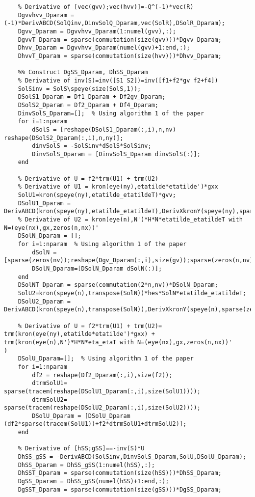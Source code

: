 \documentclass{article}
\begin{document}
\begin{verbatim}
    % Derivative of [vec(gvv);vec(hvv)]=-Q^(-1)*vec(R)
    Dgvvhvv_Dparam = (-1)*DerivABCD(SolQinv,DinvSolQ_Dparam,vec(SolR),DSolR_Dparam);
    Dgvv_Dparam = Dgvvhvv_Dparam(1:numel(gvv),:);
    DgvvT_Dparam = sparse(commutation(size(gvv)))*Dgvv_Dparam;
    Dhvv_Dparam = Dgvvhvv_Dparam(numel(gvv)+1:end,:);
    DhvvT_Dparam = sparse(commutation(size(hvv)))*Dhvv_Dparam;

    %% Construct DgSS_Dparam, DhSS_Dparam
    % Derivative of inv(S)=inv([S1 S2])=inv([f1+f2*gv f2+f4])
    SolSinv = SolS\speye(size(SolS,1));
    DSolS1_Dparam = Df1_Dparam + Df2gv_Dparam;
    DSolS2_Dparam = Df2_Dparam + Df4_Dparam;
    DinvSolS_Dparam=[];  % Using algorithm 1 of the paper
    for i=1:nparam
        dSolS = [reshape(DSolS1_Dparam(:,i),n,nv) reshape(DSolS2_Dparam(:,i),n,ny)];
        dinvSolS = -SolSinv*dSolS*SolSinv;
        DinvSolS_Dparam = [DinvSolS_Dparam dinvSolS(:)];
    end

    % Derivative of U = f2*trm(U1) + trm(U2)
    % Derivative of U1 = kron(eye(ny),etatilde*etatilde')*gxx
    SolU1=kron(speye(ny),etatilde_etatildeT)*gvv;
    DSolU1_Dparam = DerivABCD(kron(speye(ny),etatilde_etatildeT),DerivXkronY(speye(ny),sparse(zeros(ny^2,nparam)),etatilde_etatildeT,Detatilde_etatildeT_Dparam),gvv,Dgvv_Dparam);
    % Derivative of U2 = kron(eye(n),N')*H*N*etatilde_etatildeT with N=(eye(nx),gx,zeros(n,nx))'
    DSolN_Dparam = [];
    for i=1:nparam  % Using algorithm 1 of the paper
        dSolN = [sparse(zeros(nv));reshape(Dgv_Dparam(:,i),size(gv));sparse(zeros(n,nv))];
        DSolN_Dparam=[DSolN_Dparam dSolN(:)];
    end
    DSolNT_Dparam = sparse(commutation(2*n,nv))*DSolN_Dparam;
    SolU2=kron(speye(n),transpose(SolN))*hes*SolN*etatilde_etatildeT;
    DSolU2_Dparam = DerivABCD(kron(speye(n),transpose(SolN)),DerivXkronY(speye(n),sparse(zeros(n^2,nparam)),transpose(SolN),DSolNT_Dparam),hes,Dhes_Dparam,SolN,DSolN_Dparam,etatilde_etatildeT,Detatilde_etatildeT_Dparam);

    % Derivative of U = f2*trm(U1) + trm(U2)= trm(kron(eye(ny),etatilde*etatilde')*gxx) + trm(kron(eye(n),N')*H*N*eta_etaT with N=(eye(nx),gx,zeros(n,nx))'        )
    DSolU_Dparam=[];  % Using algorithm 1 of the paper
    for i=1:nparam
        df2 = reshape(Df2_Dparam(:,i),size(f2));
        dtrmSolU1= sparse(tracem(reshape(DSolU1_Dparam(:,i),size(SolU1))));
        dtrmSolU2= sparse(tracem(reshape(DSolU2_Dparam(:,i),size(SolU2))));
        DSolU_Dparam = [DSolU_Dparam (df2*sparse(tracem(SolU1))+f2*dtrmSolU1+dtrmSolU2)];
    end

    % Derivative of [hSS;gSS]==-inv(S)*U
    DhSS_gSS = -DerivABCD(SolSinv,DinvSolS_Dparam,SolU,DSolU_Dparam);
    DhSS_Dparam = DhSS_gSS(1:numel(hSS),:);
    DhSST_Dparam = sparse(commutation(size(hSS)))*DhSS_Dparam;
    DgSS_Dparam = DhSS_gSS(numel(hSS)+1:end,:);
    DgSST_Dparam = sparse(commutation(size(gSS)))*DgSS_Dparam;



\end{verbatim}
\end{document}
